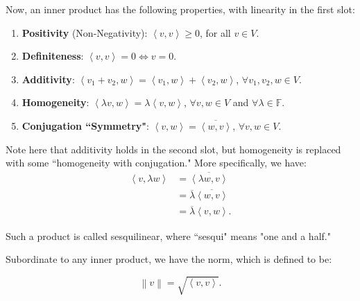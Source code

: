 \documentclass[openany]{book}
\newcommand{\norm}[1]{\left\lVert{#1}\right\rVert}
\newcommand{\innerproduct}[2]{\left\langle{#1}, {#2}\right\rangle}
\begin{document}
Now, an inner product has the following properties, with linearity in the first slot:
\begin{enumerate}
	\item \textbf{Positivity} (Non-Negativity): $\innerproduct{v}{v} \geq 0$, for all $v \in V$.
	\item \textbf{Definiteness}: $\innerproduct{v}{v}  = 0 \iff v = 0$.
	\item \textbf{Additivity}: $\innerproduct{v_{1}+v_{2}}{w} = \innerproduct{v_{1}}{w} + \innerproduct{v_{2}}{w}$, $\forall v_{1},v_{2},w \in V$.
	\item \textbf{Homogeneity}: $\innerproduct{\lambda v}{w} = \lambda \innerproduct{v}{w}$, $\forall v, w \in V$ and $\forall \lambda \in \mathbb{F}$. 
	\item \textbf{Conjugation ``Symmetry"}: $\innerproduct{v}{w} = \overline{\innerproduct{w}{v}}$, $\forall v,w \in V$.
\end{enumerate}
\begin{rmk}
	Note here that additivity holds in the second slot, but homogeneity is replaced with some ``homogeneity with conjugation." More specifically, we have:
	\begin{align*}
		\innerproduct{v}{\lambda w} &= \overline{\innerproduct{\lambda w}{v}} \\
		&= \overline{\lambda} \overline{\innerproduct{w}{v}} \\
		&= \overline{\lambda} \innerproduct{v}{w}.
	\end{align*}
\end{rmk}
\begin{rmk}
	Such a product is called sesquilinear, where ``sesqui" means "one and a half."
\end{rmk}

Subordinate to any inner product, we have the norm, which is defined to be:
\begin{defn}[Norm]
	\begin{equation*}
		\norm{v} = \sqrt{\innerproduct{v}{v}}.
	\end{equation*}
\end{defn}
\end{document}
